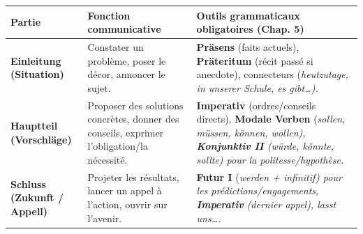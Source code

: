 \documentclass[11pt]{article}
\newcommand{\all}[1]{\ifmmode\text{\textit{#1}}\else\begingroup\selectlanguage{ngerman}\itshape #1\endgroup\fi}
\begin{document}
\begin{center}
\begin{tabularx}{\linewidth}{|X|X|X|}\hline
\rowcolor{popblueL} \textbf{Partie} & \textbf{Fonction communicative} & \textbf{Outils grammaticaux obligatoires (Chap. 5)} \\ \hline
\textbf{Einleitung (Situation)} & Constater un problème, poser le décor, annoncer le sujet. & \textbf{Präsens} (faits actuels), \textbf{Präteritum} (récit passé si anecdote), connecteurs (\all{heutzutage, in unserer Schule, es gibt…}). \\ \hline
\textbf{Hauptteil (Vorschläge)} & Proposer des solutions concrètes, donner des conseils, exprimer l'obligation/la nécessité. & \textbf{Imperativ} (ordres/conseils directs), \textbf{Modale Verben} (\all{sollen, müssen, können, wollen}), \textbf{Konjunktiv II} (\all{würde, könnte, sollte}) pour la politesse/hypothèse. \\ \hline
\textbf{Schluss (Zukunft / Appell)} & Projeter les résultats, lancer un appel à l'action, ouvrir sur l'avenir. & \textbf{Futur I} (\all{werden} + infinitif) pour les prédictions/engagements, \textbf{Imperativ} (dernier appel), \all{lasst uns…}. \\ \hline
\end{tabularx}
\end{center}
\end{document}
